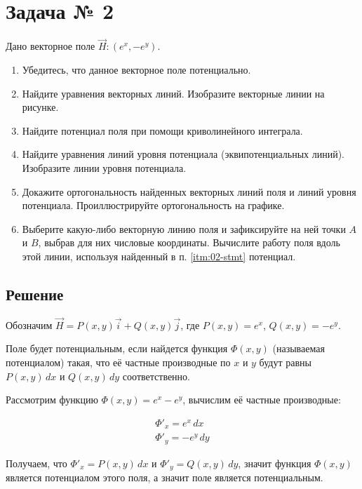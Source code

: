 \section{Задача № 2}

Дано векторное поле \(\vec{H} : \left( e^x, -e^y \right)\).

\begin{enumerate}
  \item Убедитесь, что данное векторное поле потенциально.
  \item Найдите уравнения векторных линий. Изобразите векторные линии на
        рисунке.
  \item \label{itm:02-stmt}
    Найдите потенциал поля при помощи криволинейного интеграла.
  \item Найдите уравнения линий уровня потенциала (эквипотенциальных линий).
        Изобразите линии уровня потенциала.
  \item Докажите ортогональность найденных векторных линий поля и линий уровня
        потенциала. Проиллюстрируйте ортогональность на графике.
  \item Выберите какую-либо векторную линию поля и зафиксируйте на ней точки
        \(A\) и \(B\), выбрав для них числовые координаты.
        Вычислите работу поля вдоль этой линии,
        используя найденный в п. \ref{itm:02-stmt} потенциал.
\end{enumerate}

\subsection{Решение}

Обозначим \(\vec{H} = P(x, y) \vec{i} + Q(x, y) \vec{j}\), где
\(P(x, y) = e^x\), \(Q(x, y ) = -e^y\).

Поле будет потенциальным, если найдется функция \(\Phi(x, y)\) (называемая
потенциалом) такая, что её частные производные по \(x\) и \(y\) будут равны
\(P(x, y)\,dx\) и \(Q(x, y)\,dy\) соответственно.

Рассмотрим функцию \(\Phi(x, y) = e^x - e^y\), вычислим её частные производные:

\begin{equation*}\begin{split}
    \Phi'_x = e^x\,dx \\
    \Phi'_y = -e^y\,dy
  \end{split}\end{equation*}

Получаем, что \(\Phi'_x = P(x, y)\,dx\) и \(\Phi'_y = Q(x, y)\,dy\), значит
функция \(\Phi(x, y)\) является потенциалом этого поля, а значит поле является
потенциальным.

